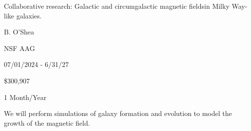 
 Collaborative research: Galactic and circumgalactic magnetic
fieldsin Milky Way-like galaxies.

 B. O'Shea

 NSF AAG 

 07/01/2024 - 6/31/27

 \$300,907

 1 Month/Year

We will perform simulations of galaxy formation and evolution to model the
growth of the magnetic field.
